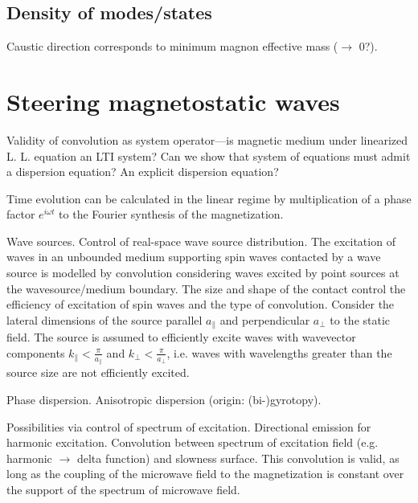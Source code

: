 \documentclass{article}
\begin{document}
\subsection{Density of modes/states}
Caustic direction corresponds to minimum magnon effective mass ($\rightarrow$ 0?).

\section{Steering magnetostatic waves}
Validity of convolution as system operator---is magnetic medium under linearized L. L. equation an LTI system? Can we show that system of equations must admit a dispersion equation? An explicit dispersion equation?

Time evolution can be calculated in the linear regime by multiplication of a phase factor $e^{i \omega t}$ to the Fourier synthesis of the magnetization.

Wave sources. Control of real-space wave source distribution. The excitation of waves in an unbounded medium supporting spin waves contacted by a wave source is modelled by convolution considering waves excited by point sources at the wavesource/medium boundary. The size and shape of the contact control the efficiency of excitation of spin waves and the type of convolution. Consider the lateral dimensions of the source parallel $a_{\parallel}$ and perpendicular $a_{\perp}$ to the static field. The source is assumed to efficiently excite waves with wavevector components $k_{\parallel} < \frac{\pi}{a_{\parallel}}$ and $k_{\perp} < \frac{\pi}{a_{\perp}}$, i.e. waves with wavelengths greater than the source size are not efficiently excited.

Phase dispersion. Anisotropic dispersion (origin: (bi-)gyrotopy).

Possibilities via control of spectrum of excitation. Directional emission for harmonic excitation. Convolution between spectrum of excitation field (e.g. harmonic $\rightarrow$ delta function) and slowness surface. This convolution is valid, as long as the coupling of the microwave field to the magnetization is constant over the support of the spectrum of microwave field.


\end{document}
